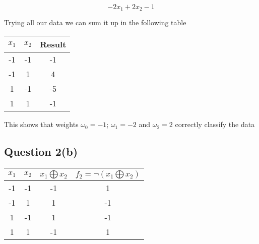 \documentclass[10pt,a4paper]{article}
\begin{document}
\begin{equation}
-2x_1 + 2x_2 - 1
\end{equation}

Trying all our data we can sum it up in the following table

\begin{tabular}{|c|c|c|}
\hline
$x_1$ & $x_2$ & Result \\
\hline
-1 &-1 & -1\\
-1 & 1 & 4\\
1  &-1 & -5\\
1  & 1 & -1 \\
\hline
\end{tabular}

This shows that weights $\omega_0 = -1$; $\omega_1 = -2$ and $\omega_2 = 2$ correctly classify the data



















\subsection{Question 2(b)}

\begin{tabular}{|c|c|c|c|}
\hline
$x_1$ & $x_2$ & $x_1 \bigoplus x_2$ & $f_2 =\neg (x_1 \bigoplus x_2)$ \\
\hline
-1 &-1 &-1 &1\\
-1 &1 &1 &-1\\
1 &-1 &1 &-1\\
1 &1 &-1 &1\\
\hline
\end{tabular}
\end{document}
